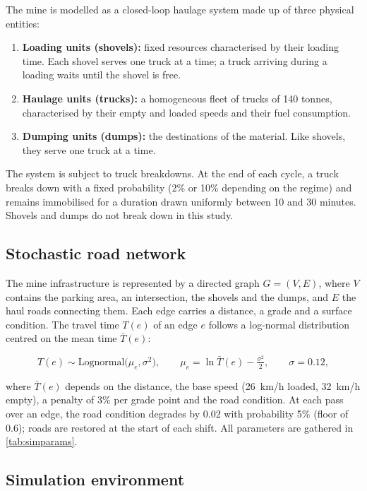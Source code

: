 \documentclass[11pt,a4paper]{article}
\newif\ifrevmarks
\newcommand{\revtag}[1]{\ifrevmarks\textsuperscript{\textcolor{red!70!black}{\scriptsize[#1]}}\fi}
\newcommand{\rev}[2]{\ifrevmarks{\color{revcolor}#2}\revtag{#1}\else#2\fi}
\begin{document}
The mine is modelled as a closed-loop haulage system made up of three physical entities:

\begin{enumerate}
  \item \textbf{Loading units (shovels):} fixed resources characterised by their loading time. Each shovel serves one truck at a time; a truck arriving during a loading waits until the shovel is free.
  \item \textbf{Haulage units (trucks):} a homogeneous fleet of trucks of 140 tonnes, characterised by their empty and loaded speeds and their fuel consumption.
  \item \textbf{Dumping units (dumps):} the destinations of the material. Like shovels, they serve one truck at a time.
\end{enumerate}

\rev{M11, N5}{The system is subject to truck breakdowns. At the end of each cycle, a truck breaks down with a fixed probability (2\% or 10\% depending on the regime) and remains immobilised for a duration drawn uniformly between 10 and 30 minutes. Shovels and dumps do not break down in this study.}

\subsection{Stochastic road network}

The mine infrastructure is represented by a directed graph $G = (V, E)$, where $V$ contains the parking area, an intersection, the shovels and the dumps, and $E$ the haul roads connecting them. \rev{M11}{Each edge carries a distance, a grade and a surface condition. The travel time $T(e)$ of an edge $e$ follows a log-normal distribution centred on the mean time $\bar T(e)$:}

\begin{equation}
T(e) \sim \mathrm{Lognormal}\big(\mu_e, \sigma^2\big), \qquad \mu_e = \ln \bar T(e) - \tfrac{\sigma^2}{2}, \qquad \sigma = 0.12 ,
\end{equation}

\rev{M11}{where $\bar T(e)$ depends on the distance, the base speed (26~km/h loaded, 32~km/h empty), a penalty of 3\% per grade point and the road condition. At each pass over an edge, the road condition degrades by 0.02 with probability 5\% (floor of 0.6); roads are restored at the start of each shift. All parameters are gathered in \cref{tab:simparams}.}

\subsection{Simulation environment}
\label{sec:simulator}
\end{document}
